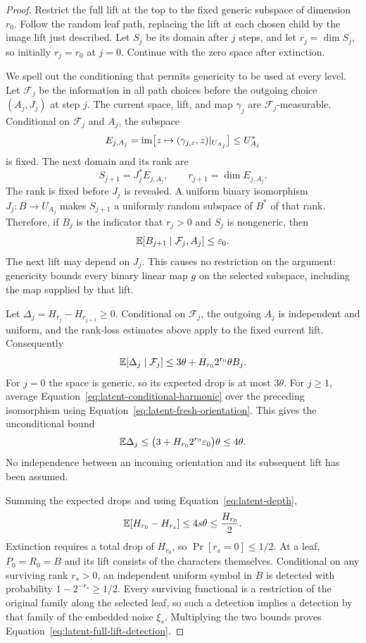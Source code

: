 \begin{proof}
Restrict the full lift at the top to the fixed generic subspace of
dimension $r_0$.  Follow the random leaf path, replacing the lift at each
chosen child by the image lift just described.  Let $S_j$ be its domain
after $j$ steps, and let $r_j=\dim S_j$, so initially $r_j=r_0$ at $j=0$.
Continue with the zero space after extinction.

We spell out the conditioning that permits genericity to be used at every
level.  Let $\mathcal F_j$ be the information in all path choices before
the outgoing choice $(A_j,J_j)$ at step $j$.  The current space, lift,
and map $\gamma_j$ are $\mathcal F_j$-measurable.
Conditional on $\mathcal F_j$ and $A_j$, the subspace
\[
 E_{j,A_j}
 =\operatorname{im}\bigl[z\mapsto(\gamma_{j,z},z)|_{U_{A_j}}\bigr]
 \le U_{A_j}^*
\]
is fixed.  The next domain and its rank are
\[
 S_{j+1}=J_j^*E_{j,A_j},
 \qquad r_{j+1}=\dim E_{j,A_j}.
\]
The rank is fixed before $J_j$ is revealed.  A uniform binary
isomorphism $J_j:B\to U_{A_j}$ makes $S_{j+1}$ a uniformly random
subspace of $B^*$ of that rank.  Therefore, if $B_j$ is the indicator
that $r_j>0$ and $S_j$ is nongeneric, then
\begin{equation}\label{eq:latent-fresh-orientation}
 \mathbb E[B_{j+1}\mid\mathcal F_j,A_j]\le\varepsilon_0.
\end{equation}
The next lift may depend on $J_j$.  This causes no restriction on the
argument: genericity bounds every binary linear map $g$ on the selected
subspace, including the map supplied by that lift.

Let $\Delta_j=H_{r_j}-H_{r_{j+1}}\ge0$.
Conditional on $\mathcal F_j$, the outgoing $A_j$ is independent and
uniform, and the rank-loss estimates above apply to the fixed current
lift.  Consequently
\begin{equation}\label{eq:latent-conditional-harmonic}
 \mathbb E[\Delta_j\mid\mathcal F_j]
 \le3\theta+H_{r_0}2^{r_0}\theta B_j.
\end{equation}
For $j=0$ the space is generic, so its expected drop is at most
$3\theta$.  For $j\ge1$, average Equation~\eqref{eq:latent-conditional-harmonic}
over the preceding isomorphism using
Equation~\eqref{eq:latent-fresh-orientation}.  This gives the unconditional
bound
\[
 \mathbb E\Delta_j
 \le\bigl(3+H_{r_0}2^{r_0}\varepsilon_0\bigr)\theta
 \le4\theta.
\]
No independence between an incoming orientation and its subsequent lift
has been assumed.

Summing the expected drops and using Equation~\eqref{eq:latent-depth},
\[
 \mathbb E[H_{r_0}-H_{r_s}]\le4s\theta\le\frac{H_{r_0}}2.
\]
Extinction requires a total drop of $H_{r_0}$, so
$\Pr[r_s=0]\le1/2$.  At a leaf, $P_0=R_0=B$ and its lift consists of
the characters themselves.  Conditional on any surviving rank $r_s>0$,
an independent uniform symbol in $B$ is detected with probability
$1-2^{-r_s}\ge1/2$.  Every surviving functional is a restriction of the
original family along the selected leaf, so such a detection implies a
detection by that family of the embedded noise $\xi_s$.  Multiplying the
two bounds proves Equation~\eqref{eq:latent-full-lift-detection}.
\end{proof}

